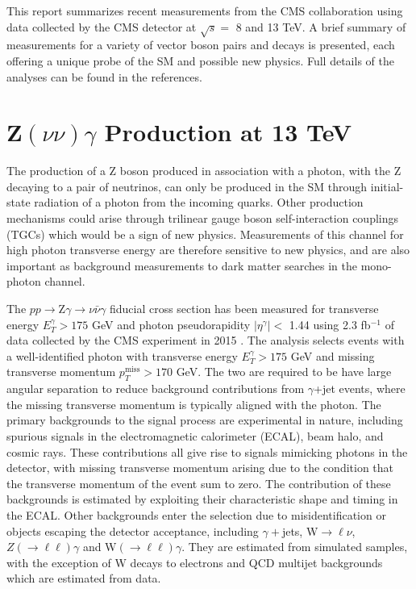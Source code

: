 \documentclass[10pt]{article}
\begin{document}
This report summarizes recent measurements from the CMS collaboration using
data collected by the CMS detector at $\sqrt{s} =$ 8 and 13 TeV. A brief summary
of measurements for a variety of vector boson pairs and decays is presented, 
each offering a unique probe of the SM and possible new physics. Full details of 
the analyses can be found in the references.

\section{Z$(\nu\nu)\gamma$ Production at 13 TeV}
The production of a Z boson produced in association with a photon,
with the Z decaying to a pair of neutrinos, can only be produced in the SM through
initial-state radiation of a photon from the incoming quarks.
Other production mechanisms could arise through trilinear gauge boson 
self-interaction couplings (TGCs) which would be a sign of new physics. 
Measurements of this channel for high photon transverse energy are therefore
sensitive to new physics, and are also important as background measurements to
dark matter searches in the mono-photon channel.

The $pp \rightarrow \mathrm{Z}\gamma \rightarrow \nu\bar{\nu}\gamma$ fiducial cross section 
has been measured for transverse energy $E_{T}^{\gamma} > 175$ GeV and photon pseudorapidity
$\lvert\eta^{\gamma}\rvert < $ 1.44 using 2.3 fb$^{-1}$ of data collected by the CMS experiment in 2015
\cite{CMS-PAS-SMP-16-004}.
The analysis selects events with a well-identified photon with transverse energy $E_{T}^{\gamma} > 175$ GeV
and missing transverse momentum $p_{T}^{\mathrm{miss}} > 170$ GeV. The two are required to be
have large angular separation to reduce background contributions from $\gamma$+jet events,
where the missing transverse momentum is typically aligned with the photon.
The primary backgrounds to the signal process are experimental in nature, including 
spurious signals in the electromagnetic calorimeter (ECAL), beam halo, and cosmic rays. 
These contributions all give rise to signals mimicking photons in the detector, 
with missing transverse momentum arising due to the 
condition that the transverse momentum of the event sum to zero. The contribution of
these backgrounds is estimated
by exploiting their characteristic shape and timing in the ECAL. Other backgrounds 
enter the selection due to misidentification or objects escaping the detector acceptance,
including $\gamma+$jets, W$\rightarrow \ell\nu$, $Z(\rightarrow\ell\ell)\gamma$ and 
W$(\rightarrow\ell\ell)\gamma$. They are estimated from simulated samples, with the exception
of W decays to electrons and QCD multijet backgrounds which are estimated from data.
\end{document}
